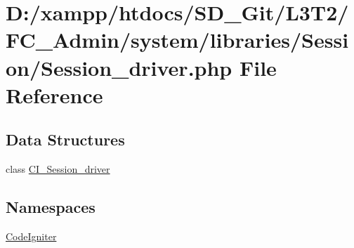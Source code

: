 \hypertarget{_admin_2system_2libraries_2_session_2_session__driver_8php}{}\section{D\+:/xampp/htdocs/\+S\+D\+\_\+\+Git/\+L3\+T2/\+F\+C\+\_\+\+Admin/system/libraries/\+Session/\+Session\+\_\+driver.php File Reference}
\label{_admin_2system_2libraries_2_session_2_session__driver_8php}
\subsection*{Data Structures}
\begin{DoxyCompactItemize}
\item 
class \hyperlink{class_c_i___session__driver}{C\+I\+\_\+\+Session\+\_\+driver}
\end{DoxyCompactItemize}
\subsection*{Namespaces}
\begin{DoxyCompactItemize}
\item 
 \hyperlink{namespace_code_igniter}{Code\+Igniter}
\end{DoxyCompactItemize}
